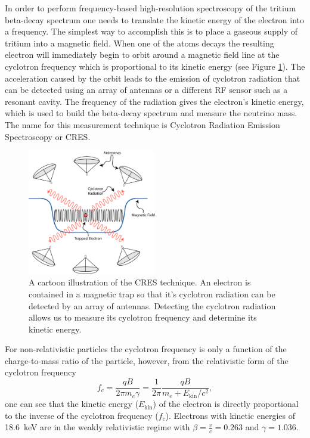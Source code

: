 In order to perform frequency-based high-resolution spectroscopy of the tritium beta-decay spectrum one needs to translate the kinetic energy of the electron into a frequency. The simplest way to accomplish this is to place a gaseous supply of tritium into a magnetic field. When one of the atoms decays the resulting electron will immediately begin to orbit around a magnetic field line at the cyclotron frequency which is proportional to its kinetic energy (see Figure \ref{fig:chap3-cres-cartoon}). The acceleration caused by the orbit leads to the emission of cyclotron radiation that can be detected using an array of antennas or a different RF sensor such as a resonant cavity. The frequency of the radiation gives the electron's kinetic energy, which is used to build the beta-decay spectrum and measure the neutrino mass. The name for this measurement technique is Cyclotron Radiation Emission Spectroscopy or CRES.

\begin{figure}[htbp]
    \centering
    \includegraphics[width=0.5\textwidth]{figs/Chapter-3/230303_cres_cartoon.png}
    \caption{A cartoon illustration of the CRES technique. An electron is contained in a magnetic trap so that it's cyclotron radiation can be detected by an array of antennas. Detecting the cyclotron radiation allows us to measure its cyclotron frequency and determine its kinetic energy.}
    \label{fig:chap3-cres-cartoon}
\end{figure}

For non-relativistic particles the cyclotron frequency is only a function of the charge-to-mass ratio of the particle, however, from the relativistic form of the cyclotron frequency
\begin{equation}
    f_c = \frac{qB}{2\pi m_e\gamma}=\frac{1}{2\pi}\frac{qB}{m_e+E_\mathrm{kin}/c^2},
    \label{eq:chap3-cyclotron-freq}
\end{equation} 
one can see that the kinetic energy ($E_\mathrm{kin}$) of the electron is directly proportional to the inverse of the cyclotron frequency ($f_c$). Electrons with kinetic energies of 18.6~keV are in the weakly relativistic regime with $\beta=\frac{v}{c}=0.263$ and $\gamma=1.036$.

